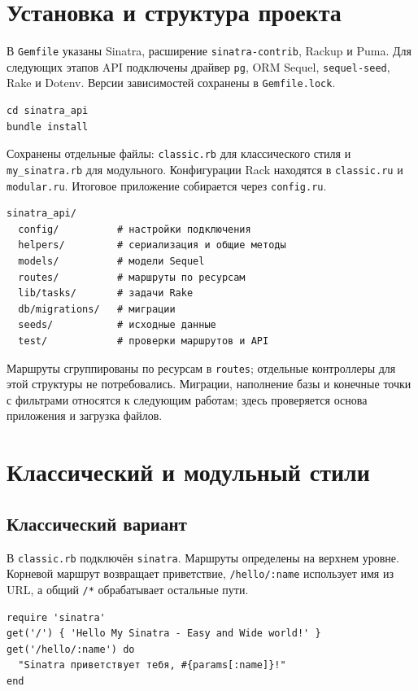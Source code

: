 \documentclass[12pt,a4paper]{article}
\begin{document}
\section{Установка и структура проекта}

В \texttt{Gemfile} указаны Sinatra, расширение \texttt{sinatra-contrib}, Rackup и Puma. Для следующих этапов API подключены драйвер \texttt{pg}, ORM Sequel, \texttt{sequel-seed}, Rake и Dotenv. Версии зависимостей сохранены в \texttt{Gemfile.lock}.

\begin{verbatim}
cd sinatra_api
bundle install
\end{verbatim}

Сохранены отдельные файлы: \texttt{classic.rb} для классического стиля и \texttt{my\_sinatra.rb} для модульного. Конфигурации Rack находятся в \texttt{classic.ru} и \texttt{modular.ru}. Итоговое приложение собирается через \texttt{config.ru}.

\begin{verbatim}
sinatra_api/
  config/          # настройки подключения
  helpers/         # сериализация и общие методы
  models/          # модели Sequel
  routes/          # маршруты по ресурсам
  lib/tasks/       # задачи Rake
  db/migrations/   # миграции
  seeds/           # исходные данные
  test/            # проверки маршрутов и API
\end{verbatim}

Маршруты сгруппированы по ресурсам в \texttt{routes}; отдельные контроллеры для этой структуры не потребовались. Миграции, наполнение базы и конечные точки с фильтрами относятся к следующим работам; здесь проверяется основа приложения и загрузка файлов.

\clearpage
\section{Классический и модульный стили}
\subsection{Классический вариант}

В \texttt{classic.rb} подключён \texttt{sinatra}. Маршруты определены на верхнем уровне. Корневой маршрут возвращает приветствие, \texttt{/hello/:name} использует имя из URL, а общий \texttt{/*} обрабатывает остальные пути.

\begin{verbatim}
require 'sinatra'
get('/') { 'Hello My Sinatra - Easy and Wide world!' }
get('/hello/:name') do
  "Sinatra приветствует тебя, #{params[:name]}!"
end
\end{verbatim}
\end{document}
